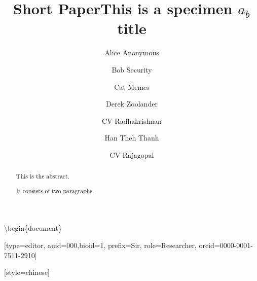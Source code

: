 \documentclass[]{elsarticle} %
\begin{document}
\begin{frontmatter}

  \title{Short Paper}
    \author[Some Institute of Technology]{Alice Anonymous}
    \author[Another University]{Bob Security}
    \author[Another University]{Cat Memes}
    \author[Some Institute of Technology]{Derek Zoolander}
      \address[Some Institute of Technology]{Department, Street, City, State, Zip}
    \address[Another University]{Department, Street, City, State, Zip}
  
  \begin{abstract}
  This is the abstract.
  
  It consists of two paragraphs.
  \end{abstract}
  
 \end{frontmatter}

\textbackslash{}begin\{document\}

\let\WriteBookmarks\relax
\def\floatpagepagefraction{1}
\def\textpagefraction{.001}

\title [mode = title]{This is a specimen $a_b$ title}                      
\tnotemark[1,2]



\author[1,3]{CV Radhakrishnan}

{[}type=editor, auid=000,bioid=1, prefix=Sir, role=Researcher,
orcid=0000-0001-7511-2910{]} \cormark[1]\fnmark[1]


\address[1]{Elsevier B.V., Radarweg 29, 1043 NX Amsterdam, The Netherlands}

\author[2,4]{Han Theh Thanh}

{[}style=chinese{]}

\author[2,3]{CV Rajagopal}
\end{document}
